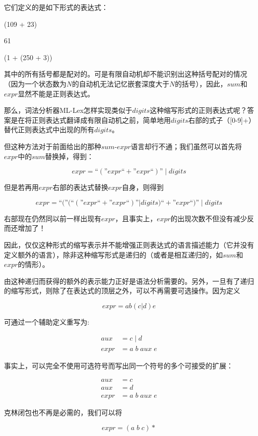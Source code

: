 \documentclass[cn,11pt,chinese]{elegantbook}
\begin{document}
它们定义的是如下形式的表达式：

(109 + 23)

61

(1 + (250 + 3))

其中的所有括号都是配对的。可是有限自动机却不能识别出这种括号配对的情况（因为一个状态数为$N$的自动机无法记忆嵌套深度大于$N$的括号），因此，$sum$和$expr$显然不能是正则表达式。

那么，词法分析器ML-Lex怎样实现类似于$digits$这种缩写形式的正则表达式呢？答案是在将正则表达式翻译成有限自动机之前，简单地用$digits$右部的式子（[0-9]+）替代正则表达式中出现的所有$digits$。

但这种方法对于前面给出的那种$sum$-$expr$语言却行不通；我们虽然可以首先将$expr$中的$sum$替换掉，得到：

$$
expr=\text{``}(\text{''}expr\text{``}+\text{''}expr\text{``})\text{''} \; | \; digits
$$

但是若再用$expr$右部的表达式替换$expr$自身，则得到

$$
expr=\text{``}(\text{''}(\text{``}(\text{''}expr\text{``}+\text{''}expr\text{``})\text{''}|digits)\text{``}+\text{''}expr\text{``})\text{''} \; | \; digits
$$

右部现在仍然同以前一样出现有$expr$，且事实上，$expr$的出现次数不但没有减少反而还增加了！

因此，仅仅这种形式的缩写表示并不能增强正则表达式的语言描述能力（它并没有定义额外的语言），除非这种缩写形式是递归的（或者是相互递归的，如$sum$和$expr$的情形）。

由这种递归而获得的额外的表示能力正好是语法分析需要的。另外，一旦有了递归的缩写形式，则除了在表达式的顶层之外，可以不再需要可选操作。因为定义

$$
expr=ab(c|d)e
$$

可通过一个辅助定义重写为:

\begin{align*}
aux &= c \; | \; d \\
expr &=a \; b \; aux \; e  
\end{align*}

事实上，可以完全不使用可选符号而写出同一个符号的多个可接受的扩展：

\begin{align*}
aux &= c \\
aux &= d \\
expr &= a \; b \; aux \; e
\end{align*}

克林闭包也不再是必需的，我们可以将

$$
expr=(a \; b \; c)*
$$
\end{document}
